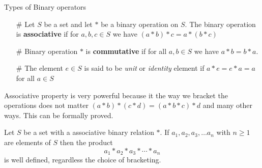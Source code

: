 \documentclass[16pt,a4paper]{article}
\theoremstyle{definition}
\begin{document}
\begin{defn}{Types of Binary operators}{}
\begin{itemize}
\item[\#] Let $S$ be a set and let $*$ be a binary operation on $S$. The binary operation is \textbf{associative} if for $a,b,c \in S$ we have $(a*b)*c = a*(b*c)$   





\item[\#] Binary operation  $*$ is \textbf{commutative} if for all $a,b \in S$ we have $a*b = b*a$. 

\item[\#] The element $e\in S$ is said to be \textit{unit} or \textit{identity} element if $a*e = e*a = a$ for all $a\in S$ 






\end{itemize}
\end{defn}



Associative property is very powerful because it the way we bracket the operations does not matter $(a*b)*(c*d) = (a*b*c)*d$ and many other ways. This can be formally proved.  

\begin{prop}{}{}
Let $S$ be a set with a associative binary relation $*$. If $a_1, a_2, a_3,\ldots a_n$ with $n\geq 1$ are elements of $S$ then the product 
\[a_1 * a_2 * a_3 * \cdots * a_n\]
is well defined, regardless the choice of bracketing. 
\end{prop}
\end{document}
